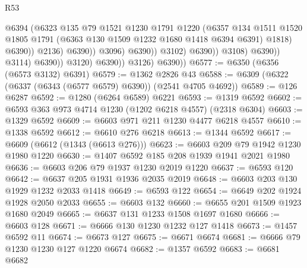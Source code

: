 \begin{lexlean}{R53}
\begin{coremodule}
                                                @6394
                                                (@6323
                                                  @135
                                                  @79
                                                  @1521
                                                  @1230
                                                  @1791
                                                  @1220
                                                  (@6357
                                                    @134
                                                    @1511
                                                    @1520
                                                    @1805
                                                    @1791
                                                    (@6363 @130 @1509 @1232 @1680 @1418 @6394 @6391)
                                                    @1818)
                                                  @6390))
                                              @2136)
                                            @6390))
                                        @3096)
                                      @6390))
                                  @3102)
                                @6390))
                            @3108)
                          @6390))
                      @3114)
                    @6390))
                @3120)
              @6390))
          @3126)
        @6390))
@6577 := @6350 (@6356 (@6573 @3132) @6391)
@6579 := @1362 @2826 @43
@6588 := @6309 (@6322 (@6337 (@6343 (@6577 @6579) @6390)) (@2541 @4705 @4692))
@6589 := @126 @6287
@6592 := @1280 (@6264 @6589) @6221
@6593 := @1319 @6592
@6602 := @6593 @363 @973 @4714 @1230 (@1202 @6218 @4557) (@2318 @6304)
@6603 := @1329 @6592
@6609 := @6603 @971 @211 @1230 @4477 @6218 @4557
@6610 := @1338 @6592
@6612 := @6610 @276 @6218
@6613 := @1344 @6592
@6617 := @6609 (@6612 (@1343 (@6613 @276)))
@6623 := @6603 @209 @79 @1942 @1230 @1980 @1220
@6630 := @1407 @6592 @185 @208 @1939 @1941 @2021 @1980
@6636 := @6603 @206 @79 @1937 @1230 @2019 @1220
@6637 := @6593 @120
@6642 := @6637 @205 @1931 @1936 @2035 @2019
@6648 := @6603 @203 @130 @1929 @1232 @2033 @1418
@6649 := @6593 @122
@6654 := @6649 @202 @1924 @1928 @2050 @2033
@6655 := @6603 @132
@6660 := @6655 @201 @1509 @1923 @1680 @2049
@6665 := @6637 @131 @1233 @1508 @1697 @1680
@6666 := @6603 @128
@6671 := @6666 @130 @1230 @1232 @127 @1418
@6673 := @1457 @6592 @11
@6674 := @6673 @127
@6675 := @6671 @6674
@6681 := @6666 @79 @1230 @1230 @127 @1220 @6674
@6682 := @1357 @6592
@6683 := @6681 @6682

\end{coremodule}
\end{lexlean}
